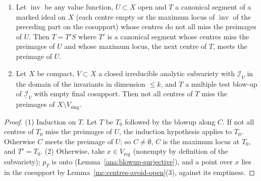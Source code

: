 \begin{lemma}
\label{mc:first-centre-exists}
\leanok
\begin{enumerate}
\item Let \(\operatorname{inv}\) be any value function, \(U\subset X\) open and \(T\) a canonical segment of a marked ideal on \(X\) (each centre empty or the
maximum locus of \(\operatorname{inv}\) of the preceding part on the cosupport) whose centres do not all miss the preimages of \(U\). Then \(T=T'S\) where \(T'\) is a
canonical segment whose centres miss the preimages of \(U\) and whose maximum locus, the next centre of \(T\), meets the preimage of \(U\).
\item Let \(X\) be compact, \(V\subset X\) a closed irreducible analytic subvariety with \(\underline{\mathcal I}_V\) in the domain of the invariants in
dimension \(\le k\), and \(T\) a multiple test blow-up of \(\underline{\mathcal I}_V\) with empty final cosupport. Then not all centres of \(T\) miss the preimages of
\(X\setminus V_{\mathrm{sing}}\).
\end{enumerate}
\end{lemma}
\begin{proof}
\leanok
(1) Induction on \(T\). Let \(T\) be \(T_0\) followed by the blowup along \(C\). If not all centres of \(T_0\) miss the preimages of \(U\), the induction hypothesis
applies to \(T_0\). Otherwise \(C\) meets the preimage of \(U\); so \(C\neq\emptyset\), \(C\) is the maximum locus at \(T_0\), and \(T'=T_0\).
(2) Otherwise, take \(x\in V_{\mathrm{reg}}\) (nonempty by definition of the subvariety); \(p_T\) is onto (Lemma~\ref{ana:blowup-surjective}), and a point over \(x\) lies in the
cosupport by Lemma~\ref{mc:centres-avoid-open}(3), against its emptiness.
\end{proof}
